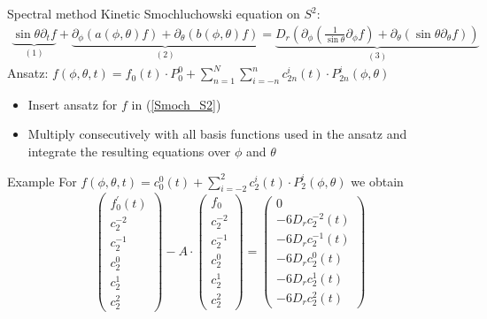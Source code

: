 \begin{frame}{Spectral method}
	\scriptsize
	Kinetic Smochluchowski equation on $S^2$:
	\begin{align}
		\underbrace{\sin \theta \partial_t f}_{(1)} + \underbrace{\partial_\phi\left(a(\phi, \theta) f\right)+\partial_\theta\left(b(\phi, \theta) f\right)}_{(2)} = \underbrace{D_r \left(\partial_\phi\left(\frac{1}{\sin \theta} \partial_\phi f\right)+\partial_\theta\left(\sin \theta \partial_\theta f\right)\right)}_{(3)} \label{Smoch_S2}
	\end{align}	
	Ansatz: $f(\phi, \theta, t) = f_0(t) \cdot P_0^0 + \sum_{n=1}^{N} \sum_{i=-n}^{n} c^i_{2n}(t) \cdot P^i_{2n}(\phi, \theta)$
 	\vspace{12pt}
 	\begin{itemize}
 		\item Insert ansatz for $f$ in (\ref{Smoch_S2}) 
 		\item Multiply consecutively with all basis functions used in the ansatz and integrate the resulting equations over $\phi$ and $\theta$
 	\end{itemize}
\end{frame}

\begin{frame}{Example}
	\scriptsize
	For  $f(\phi, \theta, t) = c^0_0(t) + \sum_{i=-2}^{2} c^i_{2}(t) \cdot P^i_{2}(\phi, \theta)$ we obtain
		\begin{equation}
		\left(\begin{array}{c}
			f_0^{\prime}(t) \\
			c_2^{-2} \\
			c_2^{-1} \\
			c_2^0 \\
			c_2^1 \\
			c_2^2
		\end{array}\right) - A \cdot
		\left(\begin{array}{c}
			f_0 \\
			c_2^{-2} \\
			c_2^{-1} \\
			c_2^0 \\
			c_2^1 \\
			c_2^2
		\end{array}\right) = 
		\left(\begin{array}{c}
			0 \\
			-6 D_r c^{-2}_2(t) \\
			-6 D_r c_2^{-1}(t) \\
			-6 D_r c_2^0(t) \\
			-6 D_r c_2^1(t) \\
			-6 D_r c_2^2(t)
		\end{array}\right)
	\end{equation}
\end{frame}

